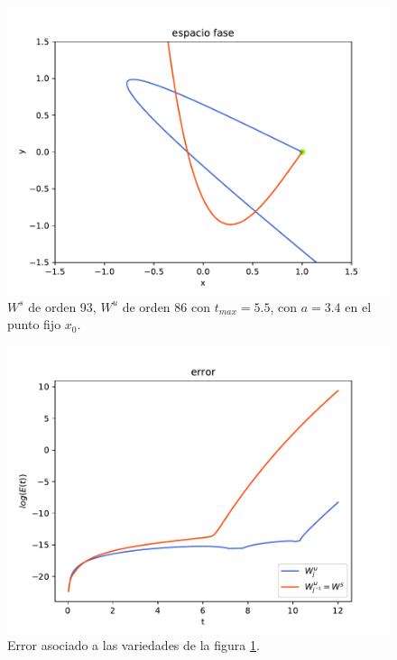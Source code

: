 \begin{figure}[H]
\centering
\includegraphics[scale=0.6]{jung34}
\caption{$W^{s}$ de orden 93, $W^{u}$ de orden 86 con $t_{max}=5.5$, con $a=3.4$ en el punto fijo $x_{0}$.}
\label{jung1}
\end{figure}


\begin{figure}[H]
\centering
\includegraphics[scale=0.6]{error_jung34}
\caption{Error asociado a las variedades de la figura \ref{jung1}.}
\label{errorjung1}
\end{figure}





